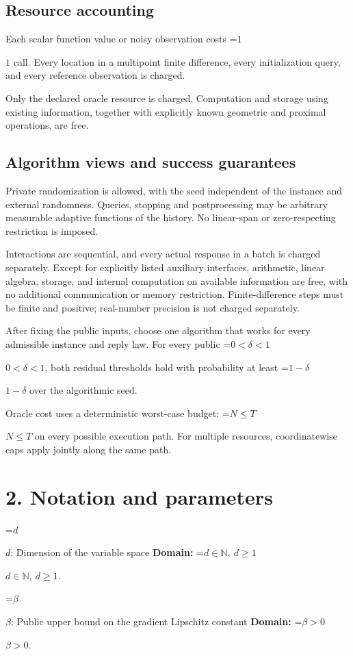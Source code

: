 \documentclass[10pt,a4paper]{article}
\newcommand{\AtlasMath}[1]{\par\begingroup\centering\setbox0=\hbox{$\displaystyle #1$}\ifdim\wd0>1.4\linewidth\typeout{ATLAS WIDE FORMULA: \the\wd0}\fi\ifdim\wd0>\linewidth\resizebox{\linewidth}{!}{\box0}\else\box0\fi\par\endgroup}
\newcommand{\AtlasInlineMath}[1]{\begingroup\setbox0=\hbox{$#1$}\ifdim\wd0>.4\linewidth\endgroup\AtlasMath{#1}\else\endgroup$#1$\fi}
\begin{document}
\subsection{Resource accounting}
Each scalar function value or noisy observation costs \AtlasInlineMath{1} call. Every location in a multipoint finite difference, every initialization query, and every reference observation is charged.

Only the declared oracle resource is charged. Computation and storage using existing information, together with explicitly known geometric and proximal operations, are free.

\subsection{Algorithm views and success guarantees}
Private randomization is allowed, with the seed independent of the instance and external randomness. Queries, stopping and postprocessing may be arbitrary measurable adaptive functions of the history. No linear-span or zero-respecting restriction is imposed.

Interactions are sequential, and every actual response in a batch is charged separately. Except for explicitly listed auxiliary interfaces, arithmetic, linear algebra, storage, and internal computation on available information are free, with no additional communication or memory restriction. Finite-difference steps must be finite and positive; real-number precision is not charged separately.

After fixing the public inputs, choose one algorithm that works for every admissible instance and reply law. For every public \AtlasInlineMath{0<\delta<1}, both residual thresholds hold with probability at least \AtlasInlineMath{1-\delta} over the algorithmic seed.

Oracle cost uses a deterministic worst-case budget: \AtlasInlineMath{N\le T} on every possible execution path. For multiple resources, coordinatewise caps apply jointly along the same path.

\section{2. Notation and parameters}
\AtlasInlineMath{d}: Dimension of the variable space \textbf{Domain:} \AtlasInlineMath{d\in\mathbb{N},\ d\ge1}.

\AtlasInlineMath{\beta}: Public upper bound on the gradient Lipschitz constant \textbf{Domain:} \AtlasInlineMath{\beta>0}.
\end{document}
